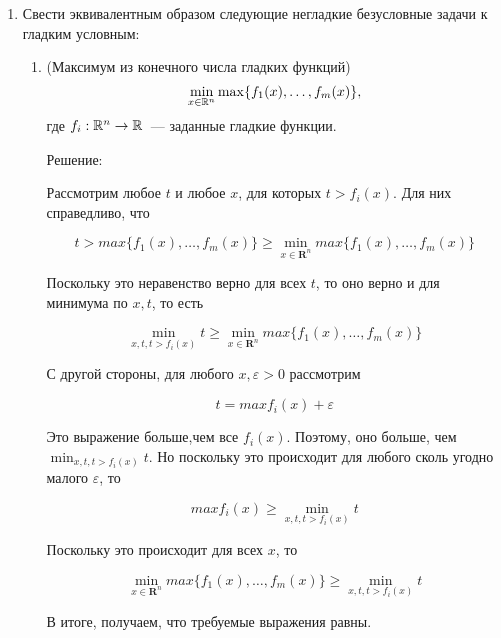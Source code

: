 \documentclass{article}
\begin{document}
\begin{enumerate}[label=\textbf{\arabic*}, leftmargin=0em]
\newpage

\newpage

\item Свести эквивалентным образом следующие негладкие безусловные задачи к гладким условным:
\begin{enumerate}
\item (Максимум из конечного числа гладких функций)
\begin{equation}
\min_{x \in \mathbb{R}^n} \max\{f_1(x), \dots, f_m(x) \},
\end{equation}
где $f_i : \mathbb{R}^n \to \mathbb{R}$~--- заданные гладкие функции.

Решение:

Рассмотрим любое $t$ и любое $x$, для которых $t > f_i(x)$. Для них справедливо, что

$$
t > max\{f_1(x),\ldots,f_m(x)\} \geq \min_{x \in \mathbf{R}^n} max\{f_1(x),\ldots,f_m(x)\}
$$

Поскольку это неравенство верно для всех $t$, то оно верно и для минимума по $x, t$, то есть

$$\min_{x,t, t > f_i(x)} t \geq \min_{x \in \mathbf{R}^n} max\{f_1(x),\ldots,f_m(x)\}$$

С другой стороны, для любого $x, \varepsilon > 0$ рассмотрим

$$
t = max{f_i(x)} + \varepsilon
$$

Это выражение больше,чем все $f_i(x)$. Поэтому, оно больше, чем $\min_{x,t, t > f_i(x)} t$. Но поскольку это происходит для любого сколь угодно малого $\varepsilon$, то

$$
max{f_i(x)} \geq \min_{x,t, t > f_i(x)} t
$$

Поскольку это происходит для всех $x$, то

$$\min_{x \in \mathbf{R}^n} max\{f_1(x),\ldots,f_m(x)\} \geq \min_{x,t, t > f_i(x)} t $$

В итоге, получаем, что требуемые выражения равны.


\end{enumerate}
\end{enumerate}
\end{document}
